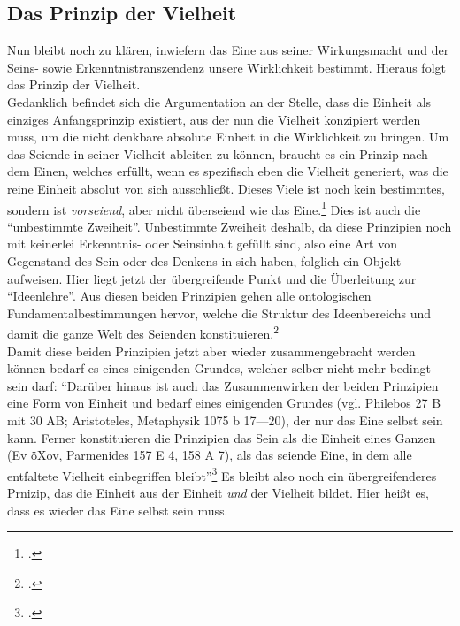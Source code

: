 \subsection{Das Prinzip der Vielheit}
Nun bleibt noch zu klären, inwiefern das Eine aus seiner Wirkungsmacht und der Seins- sowie Erkenntnistranszendenz unsere Wirklichkeit bestimmt. Hieraus folgt das Prinzip der Vielheit.\\
Gedanklich befindet sich die Argumentation an der Stelle, dass die Einheit als einziges Anfangsprinzip existiert, aus der nun die Vielheit konzipiert werden muss, um die nicht denkbare absolute Einheit in die Wirklichkeit zu bringen. Um das Seiende in seiner Vielheit ableiten zu können, braucht es ein Prinzip nach dem Einen, welches erfüllt, wenn es spezifisch eben die Vielheit generiert, was die reine Einheit absolut von sich ausschließt. Dieses Viele ist noch kein bestimmtes, sondern ist \emph{vorseiend}, aber nicht überseiend wie das Eine.\footcite[vgl.][S. 103]{halfwassen2015spuren} Dies ist auch die \enquote{unbestimmte Zweiheit}. Unbestimmte Zweiheit deshalb, da diese Prinzipien noch mit keinerlei Erkenntnis- oder Seinsinhalt gefüllt sind, also eine Art von Gegenstand des Sein oder des Denkens in sich haben, folglich ein Objekt aufweisen.
Hier liegt jetzt der übergreifende Punkt und die Überleitung zur \enquote{Ideenlehre}. Aus diesen beiden Prinzipien gehen alle ontologischen Fundamentalbestimmungen hervor, welche die Struktur des Ideenbereichs und damit die ganze Welt des Seienden konstituieren.\footcite[vgl.][S. 104]{halfwassen2015spuren}\\
Damit diese beiden Prinzipien jetzt aber wieder zusammengebracht werden können bedarf es eines einigenden Grundes, welcher selber nicht mehr bedingt sein darf:
\enquote{Darüber hinaus ist auch das Zusammenwirken der beiden Prinzipien eine Form von Einheit und bedarf eines einigenden Grundes (vgl. Philebos 27 B mit 30 AB; Aristoteles, Metaphysik 1075 b 17—20), der nur das Eine selbst sein kann. Ferner konstituieren die Prinzipien das Sein als die Einheit eines Ganzen (Ev öXov, Parmenides 157 E 4, 158 A 7), als das seiende Eine, in dem alle entfaltete Vielheit einbegriffen bleibt}\footcite[][S. 106]{halfwassen2015spuren}
Es bleibt also noch ein übergreifenderes Prnizip, das die Einheit aus der Einheit \emph{und} der Vielheit bildet. Hier heißt es, dass es wieder das Eine selbst sein muss.
